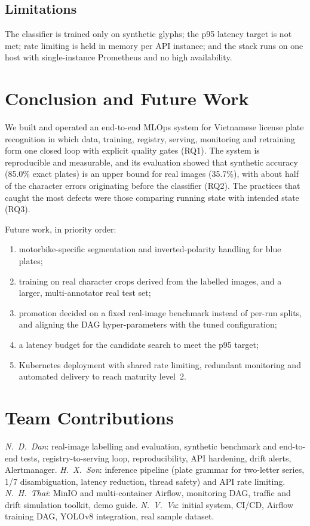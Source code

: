 \documentclass[conference]{IEEEtran}
\begin{document}
\subsection{Limitations}
The classifier is trained only on synthetic glyphs; the p95 latency target is not
met; rate limiting is held in memory per API instance; and the stack runs on one
host with single-instance Prometheus and no high availability.

\section{Conclusion and Future Work}\label{sec:concl}
We built and operated an end-to-end MLOps system for Vietnamese license plate
recognition in which data, training, registry, serving, monitoring and
retraining form one closed loop with explicit quality gates (RQ1). The system is
reproducible and measurable, and its evaluation showed that synthetic accuracy
(85.0\% exact plates) is an upper bound for real images (35.7\%), with about half of
the character errors originating before the classifier (RQ2). The practices that
caught the most defects were those comparing running state with intended state
(RQ3).

Future work, in priority order:
\begin{enumerate}
\item motorbike-specific segmentation and inverted-polarity handling for blue
plates;
\item training on real character crops derived from the labelled images, and a
larger, multi-annotator real test set;
\item promotion decided on a fixed real-image benchmark instead of per-run splits,
and aligning the DAG hyper-parameters with the tuned configuration;
\item a latency budget for the candidate search to meet the p95 target;
\item Kubernetes deployment with shared rate limiting, redundant monitoring and
automated delivery to reach maturity level~2.
\end{enumerate}

\section*{Team Contributions}
\textit{N.~D.~Dan}: real-image labelling and evaluation, synthetic benchmark and
end-to-end tests, registry-to-serving loop, reproducibility, API hardening, drift
alerts, Alertmanager. \textit{H.~X.~Son}: inference pipeline (plate grammar for
two-letter series, 1/7 disambiguation, latency reduction, thread safety) and API
rate limiting. \textit{N.~H.~Thai}: MinIO and multi-container Airflow, monitoring
DAG, traffic and drift simulation toolkit, demo guide. \textit{N.~V.~Vu}: initial
system, CI/CD, Airflow training DAG, YOLOv8 integration, real sample dataset.
\end{document}
